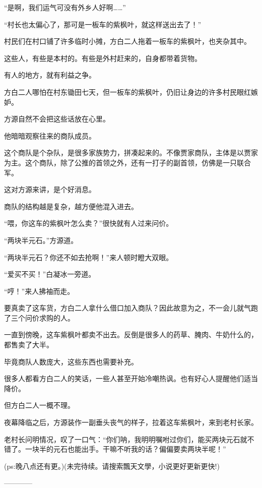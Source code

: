 \begin{this_body}
“是啊，我们运气可没有外乡人好啊……”

“村长也太偏心了，那可是一板车的紫枫叶，就这样送出去了！”

村民们在村口铺了许多临时小摊，方白二人拖着一板车的紫枫叶，也夹杂其中。

这些人，有些是本村的。有些是外村赶来的，自身都带着货物。

有人的地方，就有利益之争。

方白二人哪怕在村东锄田七天，但一板车的紫枫叶，仍旧让身边的许多村民眼红嫉妒。

方源自然不会把这些话放在心里。

他暗暗观察往来的商队成员。

这个商队是个杂队，是很多家族势力，拼凑起来的。不像贾家商队，主体是以贾家为主。这个商队，除了公推的首领之外，还有一打子的副首领，仿佛是一只联合军。

这对方源来讲，是个好消息。

商队的结构越是复杂，越方便他混入进去。

“喂，你这车的紫枫叶怎么卖？”很快就有人过来问价。

“两块半元石。”方源道。

“两块半元石？你还不如去抢啊！”来人顿时瞪大双眼。

“爱买不买！”白凝冰一旁道。

“哼！”来人拂袖而走。

要真卖了这车货，方白二人拿什么借口加入商队？因此故意为之，不一会儿就气跑了三个问价求购的人。

一直到傍晚，这车紫枫叶都卖不出去。反倒是很多人的药草、腌肉、牛奶什么的，都售卖了大半。

毕竟商队人数庞大，这些东西也需要补充。

很多人都看方白二人的笑话，一些人甚至开始冷嘲热讽。也有好心人提醒他们适当降价。

但方白二人一概不理。

夜幕降临之后，方源装作一副垂头丧气的样子，拉着这车紫枫叶，来到老村长家。

老村长问明情况，叹了一口气：“你们呐，我明明嘱咐过你们，能买两块元石就不错了。一块半的元石也能出手。干嘛不听我的话？偏偏要卖两块半呢！”

(ps:晚八点还有更。)(未完待续。请搜索飄天文學，小说更好更新更快!)

------------

\end{this_body}

